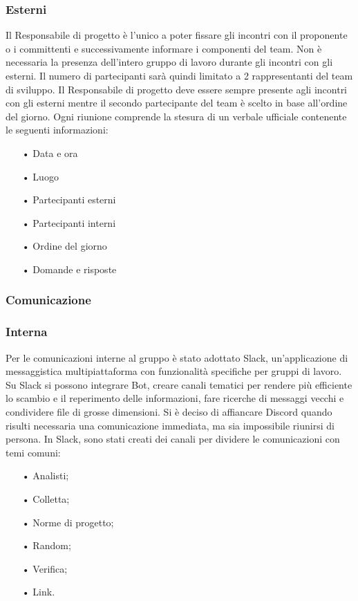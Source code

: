 \subsubsection{Esterni}
Il Responsabile di progetto è l'unico a poter fissare gli incontri con il proponente o i committenti e successivamente informare i componenti del team. Non è necessaria la presenza dell’intero gruppo di lavoro durante gli incontri con gli esterni. Il numero di partecipanti sarà quindi limitato a 2 rappresentanti del team di sviluppo.  
\newline
Il Responsabile di progetto deve essere sempre presente agli incontri con gli esterni mentre il secondo partecipante del team è scelto in base all’ordine del giorno. 
\newline
Ogni riunione comprende la stesura di un verbale ufficiale contenente le seguenti informazioni:
\begin{itemize}
\item[•] Data e ora
\item[•] Luogo
\item[•] Partecipanti esterni
\item[•] Partecipanti interni
\item[•] Ordine del giorno
\item[•] Domande e risposte
\end{itemize}

\subsubsection{Comunicazione}

\subsubsection{Interna}

Per le comunicazioni interne al gruppo è stato adottato Slack, un'applicazione di messaggistica multipiattaforma con funzionalità specifiche per gruppi di lavoro.  
\newline
Su Slack si possono integrare Bot, creare canali tematici per rendere più efficiente lo scambio e il reperimento delle informazioni, fare ricerche di messaggi vecchi e condividere file di grosse dimensioni. 
\newline
Si è deciso di affiancare Discord quando risulti necessaria una comunicazione immediata, ma sia impossibile riunirsi di persona.  
\newline
In Slack, sono stati creati dei canali per dividere le comunicazioni con temi comuni:
\begin{itemize}
\item[•] Analisti;
\item[•] Colletta;
\item[•] Norme di progetto;
\item[•] Random;
\item[•] Verifica;
\item[•] Link.
\end{itemize}

